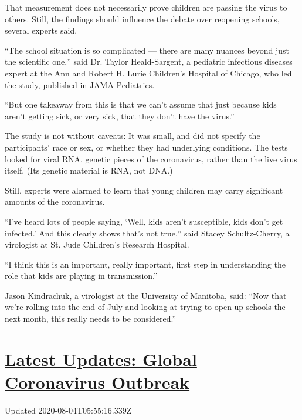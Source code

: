 That measurement does not necessarily prove children are passing the
virus to others. Still, the findings should influence the debate over
reopening schools, several experts said.

``The school situation is so complicated --- there are many nuances
beyond just the scientific one,'' said Dr. Taylor Heald-Sargent, a
pediatric infectious diseases expert at the Ann and Robert H. Lurie
Children's Hospital of Chicago, who led the study, published in JAMA
Pediatrics.

``But one takeaway from this is that we can't assume that just because
kids aren't getting sick, or very sick, that they don't have the
virus.''

The study is not without caveats: It was small, and did not specify the
participants' race or sex, or whether they had underlying conditions.
The tests looked for viral RNA, genetic pieces of the coronavirus,
rather than the live virus itself. (Its genetic material is RNA, not
DNA.)

Still, experts were alarmed to learn that young children may carry
significant amounts of the coronavirus.

``I've heard lots of people saying, `Well, kids aren't susceptible, kids
don't get infected.' And this clearly shows that's not true,'' said
Stacey Schultz-Cherry, a virologist at St. Jude Children's Research
Hospital.

``I think this is an important, really important, first step in
understanding the role that kids are playing in transmission.''

Jason Kindrachuk, a virologist at the University of Manitoba, said:
``Now that we're rolling into the end of July and looking at trying to
open up schools the next month, this really needs to be considered.''

\hypertarget{latest-updates-global-coronavirus-outbreak}{%
\section{\texorpdfstring{\href{https://www.nytimes.com/2020/08/03/world/coronavirus-covid-19.html?action=click\&pgtype=Article\&state=default\&region=MAIN_CONTENT_1\&context=storylines_live_updates}{Latest
Updates: Global Coronavirus
Outbreak}}{Latest Updates: Global Coronavirus Outbreak}}\label{latest-updates-global-coronavirus-outbreak}}

Updated 2020-08-04T05:55:16.339Z

